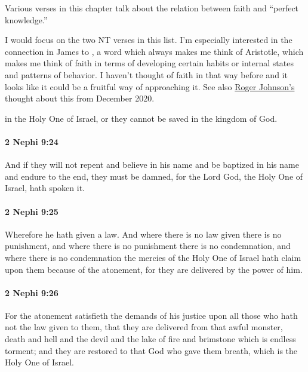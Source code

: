 {\begin{compactdesc}
								\begin{compactitem}
									\item Various verses in this chapter talk about the relation between faith and ``perfect knowledge.''
								\end{compactitem}
						\end{compactdesc}
					I would focus on the two NT verses in this list. I'm especially interested in the connection in James to , a word which always makes me think of Aristotle, which makes me think of faith in terms of developing certain habits or internal states and patterns of behavior. I haven't thought of faith in that way before and it looks like it could be a fruitful way of approaching it. See also \hyperref[FAITH-others]{Roger Johnson's} thought about this from December 2020.
					}
			in the Holy One of Israel,
			or they cannot be saved in the kingdom of God.

		\paragraph{2 Nephi 9:24} %
			\label{2NEPHI-9-24}

			And if they will not repent and believe in his name
			and be baptized in his name and endure to the end,
			they must be damned,
			for the Lord God, the Holy One of Israel, hath spoken it.

		\paragraph{2 Nephi 9:25} %
			\label{2NEPHI-9-25}

			Wherefore he hath given a law.
			And where there is no law given there is no punishment,
			and where there is no punishment there is no condemnation,
			and where there is no condemnation
			the mercies of the Holy One of Israel hath claim upon them
			because of the atonement,
			for they are delivered by the power of him.

		\paragraph{2 Nephi 9:26} %
			\label{2NEPHI-9-26}

			For the atonement satisfieth the demands of his justice
			upon all those who hath not the law given to them,
			that they are delivered from that awful monster, death and hell and the devil
			and the lake of fire and brimstone which is endless torment;
			and they are restored to that God who gave them breath,
			which is the Holy One of Israel.

